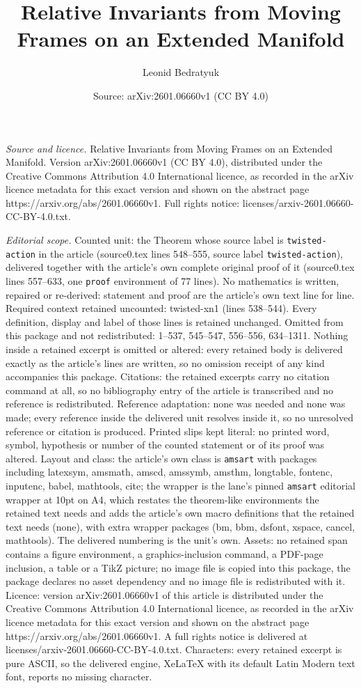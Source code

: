 \documentclass[10pt,a4paper]{amsart}
\title[Relative Invariants from Moving Frames on an Extended Manifo]{Relative Invariants from Moving Frames on an Extended Manifold}
\author{Leonid Bedratyuk}
\date{Source: arXiv:2601.06660v1 (CC BY 4.0)}
\begin{document}
\maketitle

\noindent\emph{Source and licence.} Relative Invariants from Moving Frames on an Extended Manifold. Version arXiv:2601.06660v1 (CC BY 4.0), distributed under the Creative Commons Attribution 4.0 International licence, as recorded in the arXiv licence metadata for this exact version and shown on the abstract page https://arxiv.org/abs/2601.06660v1. Full rights notice: licenses/arxiv-2601.06660-CC-BY-4.0.txt.\par\smallskip

\noindent\textit{Editorial scope.} Counted unit: the Theorem whose source label is \texttt{twisted-action} in the article (source0.tex lines 548--555, source label \texttt{twisted-action}), delivered together with the article's own complete original proof of it (source0.tex lines 557--633, one \texttt{proof} environment of 77 lines). No mathematics is written, repaired or re-derived: statement and proof are the article's own text line for line. Required context retained uncounted: twisted-xn1 (lines 538--544). Every definition, display and label of those lines is retained unchanged. Omitted from this package and not redistributed: 1--537, 545--547, 556--556, 634--1311. Nothing inside a retained excerpt is omitted or altered: every retained body is delivered exactly as the article's lines are written, so no omission receipt of any kind accompanies this package. Citations: the retained excerpts carry no citation command at all, so no bibliography entry of the article is transcribed and no reference is redistributed. Reference adaptation: none was needed and none was made; every reference inside the delivered unit resolves inside it, so no unresolved reference or citation is produced. Printed slips kept literal: no printed word, symbol, hypothesis or number of the counted statement or of its proof was altered. Layout and class: the article's own class is \texttt{amsart} with packages including latexsym, amsmath, amscd, amssymb, amsthm, longtable, fontenc, inputenc, babel, mathtools, cite; the wrapper is the lane's pinned \texttt{amsart} editorial wrapper at 10pt on A4, which restates the theorem-like environments the retained text needs and adds the article's own macro definitions that the retained text needs (none), with extra wrapper packages (bm, bbm, dsfont, xspace, cancel, mathtools). The delivered numbering is the unit's own. Assets: no retained span contains a figure environment, a graphics-inclusion command, a PDF-page inclusion, a table or a TikZ picture; no image file is copied into this package, the package declares no asset dependency and no image file is redistributed with it. Licence: version arXiv:2601.06660v1 of this article is distributed under the Creative Commons Attribution 4.0 International licence, as recorded in the arXiv licence metadata for this exact version and shown on the abstract page https://arxiv.org/abs/2601.06660v1. A full rights notice is delivered at licenses/arxiv-2601.06660-CC-BY-4.0.txt. Characters: every retained excerpt is pure ASCII, so the delivered engine, XeLaTeX with its default Latin Modern text font, reports no missing character.
\end{document}
